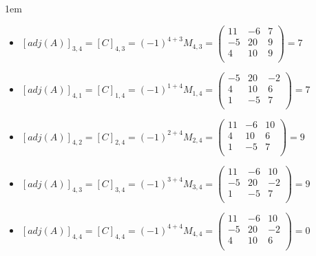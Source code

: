 \documentclass[12pt, fleqn]{article}                             %
\newenvironment{SmallIndentation}[1][0.75em]                    %
        {\begin{adjustwidth}{#1}{}\begin{footnotesize}}             %
        {\end{footnotesize}\end{adjustwidth}}                       %
\theoremstyle{break}                                            %
\newcommand{\pVector}[1]                                        %
        { \ensuremath{\begin{pmatrix}#1\end{pmatrix}} }             %
\begin{document}
\begin{itemize}
\begin{SmallIndentation}[1em]
\begin{itemize}
                    \item
                        $[adj(A)]_{3, 4} 
                            = [C]_{4, 3} 
                            = (-1)^{4+3} M_{4, 3}
                            = \pVector{
                                    11 & -6 & 7   \\ 
                                    -5 & 20 & 9   \\
                                    4  & 10& 9    \\
                                }
                            = 7$

                    \item
                        $[adj(A)]_{4, 1} 
                            = [C]_{1, 4} 
                            = (-1)^{1+4} M_{1, 4}
                            = \pVector{
                                    -5 & 20 & -2   \\
                                    4  & 10 & 6    \\
                                    1  & -5 & 7    \\
                                }
                            = 7$

                    \item
                        $[adj(A)]_{4, 2} 
                            = [C]_{2, 4} 
                            = (-1)^{2+4} M_{2, 4}
                            = \pVector{
                                    11 & -6 & 10  \\ 
                                    4  & 10 & 6   \\
                                    1  & -5 & 7   \\
                                }
                            = 9$

                    \item
                        $[adj(A)]_{4, 3} 
                            = [C]_{3, 4} 
                            = (-1)^{3+4} M_{3, 4}
                            = \pVector{
                                    11 & -6 & 10   \\ 
                                    -5 & 20 & -2   \\
                                    1  & -5 & 7    \\
                                }
                            = 9$

                    \item
                        $[adj(A)]_{4, 4} 
                            = [C]_{4, 4} 
                            = (-1)^{4+4} M_{4, 4}
                            = \pVector{
                                    11 & -6 & 10 \\ 
                                    -5 & 20 & -2 \\
                                    4  & 10 & 6  \\
                                }
                            = 0$


\end{itemize}
\end{SmallIndentation}
\end{itemize}
\end{document}
